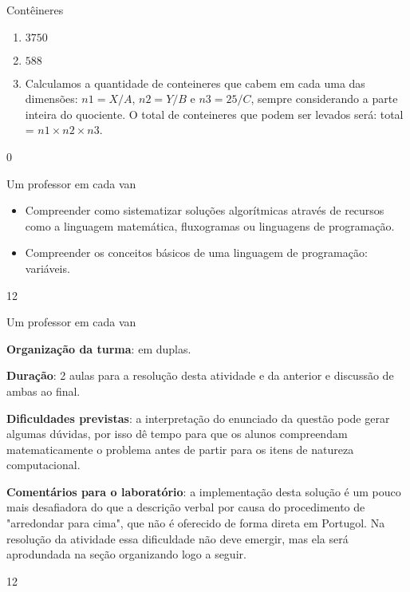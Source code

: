 \marginpar{\vspace{-1em}}
\begin{answer}{Contêineres}
{
\begin{enumerate}
\item $3750$

\item $588$

\item Calculamos a quantidade de conteineres que cabem em cada uma das dimensões: $n1=X/ A$, $n2=Y\slash B$ e $n3=25\slash C$, sempre considerando a parte inteira do quociente. O total de conteineres que podem ser levados será: total = $n1\times n2\times n3$.
\end{enumerate}
}{0}
\end{answer}
\begin{objectives}{Um professor em cada van}
{
\begin{itemize}
\item Compreender como sistematizar soluções algorítmicas através de recursos como a linguagem matemática, fluxogramas ou linguagens de programação.

\item Compreender os conceitos básicos de uma linguagem de programação: variáveis.
\end{itemize}
}{1}{2}
\end{objectives}
\begin{sugestions}{Um professor em cada van}
{
\textbf{Organização da turma}: em duplas.

\textbf{Duração}: 2 aulas para a resolução desta atividade e da anterior e discussão de ambas ao final.

\textbf{Dificuldades previstas}: a interpretação do enunciado da questão pode gerar algumas dúvidas, por isso dê tempo para que os alunos compreendam matematicamente o problema antes de partir para os itens de natureza computacional.

\textbf{Comentários para o laboratório}: a implementação desta solução é um pouco mais desafiadora do que a descrição verbal por causa do procedimento de "arredondar para cima", que não é oferecido de forma direta em Portugol. Na resolução da atividade essa dificuldade não deve emergir, mas ela será aprodundada na seção organizando logo a seguir.
}{1}{2}
\end{sugestions}
